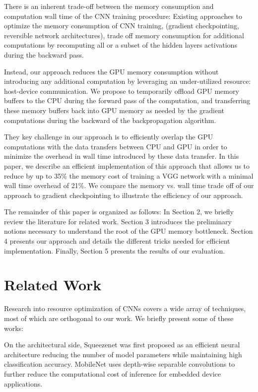 \documentclass[11pt,onecolumn]{article}
\begin{document}
There is an inherent trade-off between the memory consumption and computation wall time
of the CNN training procedure:
Existing approaches to optimize the memory consumption of CNN training,
(gradient checkpointing, reversible network architectures),
trade off memory consumption for additional computations by 
recomputing all or a subset of the hidden layers activations during the backward pass.

Instead, our approach reduces the GPU memory consumption without introducing any additional
computation by leveraging an under-utilized resource: host-device communication.
We propose to temporarily offload GPU memory buffers to the CPU during the forward pass 
of the computation, and transferring these memory buffers back into GPU memory as needed by the gradient computations during the backward of the backpropagation algorithm.

They key challenge in our approach is to efficiently overlap the GPU computations
with the data transfers between CPU and GPU in order to minimize the overhead in wall time
introduced by these data transfer.
In this paper, we describe an efficient implementation of this approach that allows us to reduce by
up to 35\% the memory cost of training a VGG network with a minimal wall time overhead of 21\%.
We compare the memory vs. wall time trade off of our approach to gradient checkpointing 
to illustrate the efficiency of our approach.

The remainder of this paper is organized as follows: In Section 2, we briefly review the literature for related work.
Section 3 introduces the preliminary notions necessary to understand the root of the GPU memory bottleneck.
Section 4 presents our approach and details the different tricks needed for efficient implementation. 
Finally, Section 5 presents the results of our evaluation.

\section{Related Work}

Research into resource optimization of CNNs covers a wide array of techniques, 
most of which are orthogonal to our work. 
We briefly present some of these works:

On the architectural side, Squeezenet \cite{iandola2016squeezenet} 
was first proposed as an efficient neural architecture 
reducing the number of model parameters while maintaining high classification accuracy.
MobileNet \cite{howard2017mobilenets} uses depth-wise separable 
convolutions to further reduce the computational cost of inference for embedded device applications.
\end{document}
